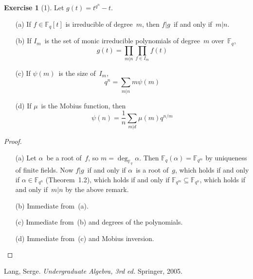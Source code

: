 \documentclass[letterpaper,12pt]{article}
\newcommand{\F}{\mathbb{F}}
\theoremstyle{definition}
\newtheorem*{exer}{Exercise}
\theoremstyle{remark}
\theoremstyle{direction}
\begin{document}
\begin{exer}[1]
Let \(g(t)=t^{q^n}-t\).
\begin{enumerate}[itemsep=0pt]
\item[(a)] If \(f\in\F_q[t]\) is irreducible of degree~\(m\), then \(f|g\)~if and only if~\(m|n\).
\item[(b)] If \(I_m\)~is the set of monic irreducible polynomials of degree~\(m\) over~\(\F_q\),
\[g(t)=\prod_{m|n}\prod_{f\in I_m}f(t)\]
\item[(c)] If \(\psi(m)\)~is the size of~\(I_m\),
\[q^n=\sum_{m|n}m\psi(m)\]
\item[(d)] If \(\mu\)~is the Mobius function, then
\[\psi(n)=\frac{1}{n}\sum_{m|d}\mu(m)q^{n/m}\]
\end{enumerate}
\end{exer}
\begin{proof}\
\begin{enumerate}[itemsep=0pt]
\item[(a)] Let \(\alpha\)~be a root of~\(f\), so \(m=\deg_{\F_q}\alpha\). Then \(\F_q(\alpha)=\F_{q^m}\) by uniqueness of finite fields. Now \(f|g\)~if and only if \(\alpha\)~is a root of~\(g\), which holds if and only if \(\alpha\in\F_{q^n}\) (Theorem~1.2), which holds if and only if \(\F_{q^m}\subseteq\F_{q^n}\), which holds if and only if~\(m|n\) by the above remark.
\item[(b)] Immediate from~(a).
\item[(c)] Immediate from~(b) and degrees of the polynomials.
\item[(d)] Immediate from~(c) and Mobius inversion.\qedhere
\end{enumerate}
\end{proof}

\begin{thebibliography}{0}
 Lang, Serge. \textit{Undergraduate Algebra, 3rd ed.} Springer, 2005.
\end{thebibliography}
\end{document}

